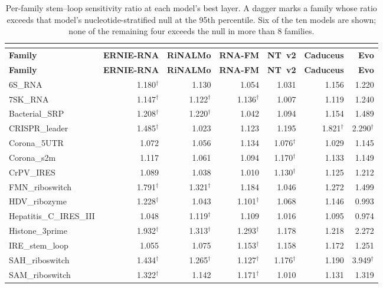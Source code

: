 \begin{longtable}{@{}lrrrrrr@{}}
\caption{Per-family stem--loop sensitivity ratio at each model's best layer. A dagger marks a family whose ratio exceeds that model's nucleotide-stratified null at the 95th percentile. Six of the ten models are shown; none of the remaining four exceeds the null in more than 8 families.}\\
\label{tab:s2}\\
\toprule
\textbf{Family} & \textbf{ERNIE-RNA} & \textbf{RiNALMo} & \textbf{RNA-FM} & \textbf{NT~v2} & \textbf{Caduceus} & \textbf{Evo} \\
\midrule
\endfirsthead
\toprule
\textbf{Family} & \textbf{ERNIE-RNA} & \textbf{RiNALMo} & \textbf{RNA-FM} & \textbf{NT~v2} & \textbf{Caduceus} & \textbf{Evo} \\
\midrule
\endhead
6S\_RNA & 1.180$^\dagger$ & 1.130 & 1.054 & 1.031 & 1.156 & 1.220 \\
7SK\_RNA & 1.147$^\dagger$ & 1.122$^\dagger$ & 1.136$^\dagger$ & 1.007 & 1.119 & 1.240 \\
Bacterial\_SRP & 1.208$^\dagger$ & 1.220$^\dagger$ & 1.042 & 1.094 & 1.154 & 1.489 \\
CRISPR\_leader & 1.485$^\dagger$ & 1.023 & 1.123 & 1.195 & 1.821$^\dagger$ & 2.290$^\dagger$ \\
Corona\_5UTR & 1.072 & 1.056 & 1.134 & 1.076$^\dagger$ & 1.029 & 1.145 \\
Corona\_s2m & 1.117 & 1.061 & 1.094 & 1.170$^\dagger$ & 1.133 & 1.149 \\
CrPV\_IRES & 1.089 & 1.038 & 1.010 & 1.130$^\dagger$ & 1.125 & 1.212 \\
FMN\_riboswitch & 1.791$^\dagger$ & 1.321$^\dagger$ & 1.184 & 1.046 & 1.272 & 1.499 \\
HDV\_ribozyme & 1.228$^\dagger$ & 1.043 & 1.101$^\dagger$ & 1.068 & 1.146 & 0.993 \\
Hepatitis\_C\_IRES\_III & 1.048 & 1.119$^\dagger$ & 1.109 & 1.016 & 1.095 & 0.974 \\
Histone\_3prime & 1.932$^\dagger$ & 1.313$^\dagger$ & 1.293$^\dagger$ & 1.178 & 1.218 & 2.272 \\
IRE\_stem\_loop & 1.055 & 1.075 & 1.153$^\dagger$ & 1.158 & 1.172 & 1.251 \\
SAH\_riboswitch & 1.434$^\dagger$ & 1.265$^\dagger$ & 1.127$^\dagger$ & 1.176$^\dagger$ & 1.190 & 3.949$^\dagger$ \\
SAM\_riboswitch & 1.322$^\dagger$ & 1.142 & 1.171$^\dagger$ & 1.010 & 1.131 & 1.319 \\

\end{longtable}
